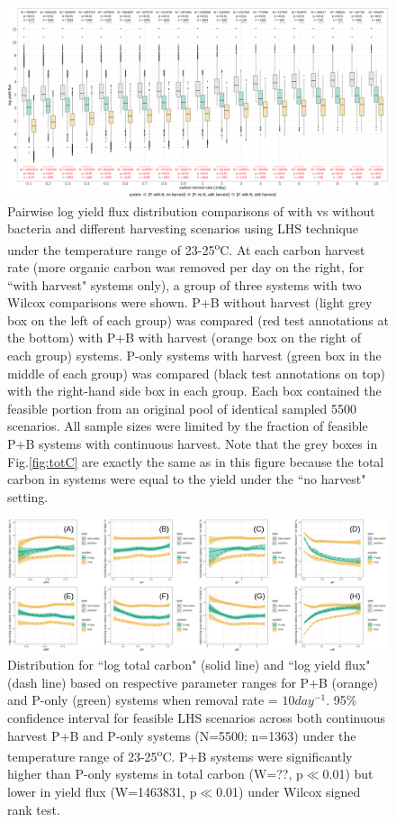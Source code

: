 \documentclass[../thesis.tex]{subfiles} %
\begin{document}
\begin{figure}[H]
    \centering
    \includegraphics[width=\linewidth]{../result/yield.png}
    \caption[Pairwise log yield flux]{Pairwise log yield flux distribution comparisons of with vs without bacteria and different harvesting scenarios using LHS technique under the temperature range of 23-25\textsuperscript{o}C.  {\scriptsize At each carbon harvest rate (more organic carbon was removed per day on the right, for ``with harvest" systems only), a group of three systems with two Wilcox comparisons were shown.  P+B without harvest (light grey box on the left of each group) was compared (red test annotations at the bottom) with P+B with harvest (orange box on the right of each group) systems.  P-only systems with harvest (green box in the middle of each group) was compared (black test annotations on top) with the right-hand side box in each group.  Each box contained the feasible portion from an original pool of identical sampled 5500 scenarios.  All sample sizes were limited by the fraction of feasible P+B systems with continuous harvest.  Note that the grey boxes in Fig.\ref{fig:totC} are exactly the same as in this figure because the total carbon in systems were equal to the yield under the ``no harvest" setting.}}
    \label{fig:yield}
\end{figure}

\begin{figure}[H]
    \centering
    \includegraphics[width=\linewidth]{../result/var_100.png}
    \caption[Log carbon distribution for $x=10day^{-1}$ by parameter]{Distribution for ``log total carbon" (solid line) and ``log yield flux" (dash line) based on respective parameter ranges for P+B (orange) and P-only (green) systems when removal rate = $10day^{-1}$.  {\scriptsize 95\% confidence interval for feasible LHS scenarios across both continuous harvest P+B and P-only systems (N=5500; n=1363) under the temperature range of 23-25\textsuperscript{o}C.  P+B systems were significantly higher than P-only systems in total carbon (W=??, p$\ll$0.01) but lower in yield flux (W=1463831, p$\ll$0.01) under Wilcox signed rank test.}}
    \label{fig:v2}
\end{figure}
\end{document}
